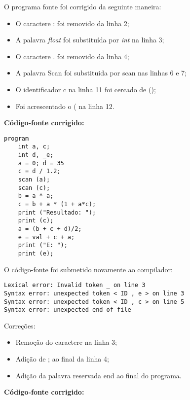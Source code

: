O programa fonte foi corrigido da seguinte maneira:

\begin{itemize}
    \item O caractere : foi removido da linha 2;
    
    \item A palavra \textit{float} foi substituída por \textit{int} na linha 3;
    
    \item O caractere . foi removido da linha 4;
    
    \item A palavra Scan foi substituida por scan nas linhas 6 e 7;
    
    \item O identificador c na linha 11 foi cercado de ();
    
    \item Foi acrescentado o ( na linha 12.
    
\end{itemize}

\textbf{Código-fonte corrigido:}

\begin{lstlisting}
program
	int a, c;
	int d, _e;
	a = 0; d = 35
	c = d / 1.2;
	scan (a);
	scan (c);
	b = a * a;
	c = b + a * (1 + a*c);
	print ("Resultado: ");
	print (c);
	a = (b + c + d)/2;
	e = val + c + a;
	print ("E: ");
	print (e);
\end{lstlisting}

O código-fonte foi submetido novamente ao compilador:

\begin{lstlisting}
Lexical error: Invalid token _ on line 3
Syntax error: unexpected token < ID , e > on line 3
Syntax error: unexpected token < ID , c > on line 5
Syntax error: unexpected end of file
\end{lstlisting}

Correções:

\begin{itemize}
    \item Remoção do caractere \textunderscore  na linha 3;
    
    \item Adição de ; ao final da linha 4;
    
    \item Adição da palavra reservada end ao final do programa.
\end{itemize}

\textbf{Código-fonte corrigido:}


